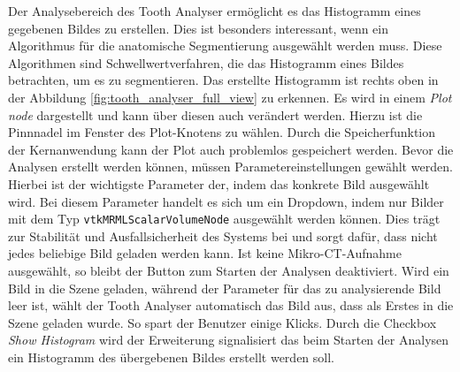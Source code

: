 Der Analysebereich des Tooth Analyser ermöglicht es das Histogramm eines gegebenen
Bildes zu erstellen. Dies ist besonders interessant, wenn ein Algorithmus für die
anatomische Segmentierung ausgewählt werden muss. Diese Algorithmen sind
Schwellwertverfahren, die das Histogramm eines Bildes betrachten, um es zu
segmentieren. Das erstellte Histogramm ist rechts oben in der Abbildung \ref{fig:tooth_analyser_full_view}
zu erkennen. Es wird in einem \textit{Plot node} dargestellt und kann über diesen
auch verändert werden. Hierzu ist die Pinnnadel im Fenster des Plot-Knotens zu
wählen. Durch die Speicherfunktion der Kernanwendung kann der Plot auch problemlos
gespeichert werden. Bevor die Analysen erstellt werden können, müssen Parametereinstellungen
gewählt werden. Hierbei ist der wichtigste Parameter der, indem das konkrete Bild
ausgewählt wird. Bei diesem Parameter handelt es sich um ein Dropdown, indem nur
Bilder mit dem Typ \texttt{vtkMRMLScalarVolumeNode} ausgewählt werden können. Dies
trägt zur Stabilität und Ausfallsicherheit des Systems bei und sorgt dafür, dass
nicht jedes beliebige Bild geladen werden kann. Ist keine Mikro-\ac{CT}-Aufnahme
ausgewählt, so bleibt der Button zum Starten der Analysen deaktiviert. Wird ein
Bild in die Szene geladen, während der Parameter für das zu analysierende Bild leer
ist, wählt der Tooth Analyser automatisch das Bild aus, dass als Erstes in die Szene
geladen wurde. So spart der Benutzer einige Klicks. Durch die Checkbox \textit{Show
Histogram} wird der Erweiterung signalisiert das beim Starten der Analysen ein
Histogramm des übergebenen Bildes erstellt werden soll.

